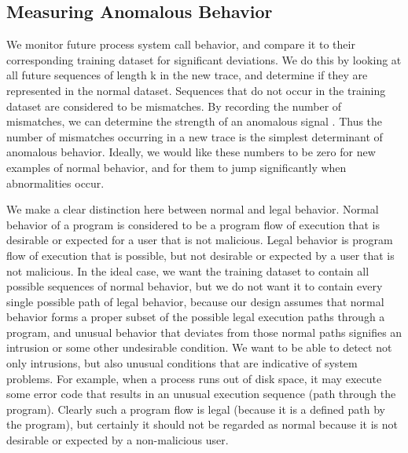 \documentclass{report}
\begin{document}
\begin{spacing}{1.5}
\section{Measuring Anomalous Behavior}


{\large
We monitor future process system call behavior, and compare it to their corresponding training dataset for significant deviations. We do this by looking at all future sequences of length k in the new trace, and determine if they are represented in the normal dataset. Sequences that do not occur in the training dataset are considered to be mismatches. By recording the number of mismatches, we can determine the strength of an anomalous signal \cite{hofmeyr1998intrusion}. Thus the number of mismatches occurring in a new trace is the simplest determinant of anomalous behavior. Ideally, we would like these numbers to be zero for new examples of normal behavior, and for them to jump significantly when abnormalities occur.
\newline
}

{\large
\noindent We make a clear distinction here between normal and legal behavior. Normal behavior of a program is considered to be a program flow of execution that is desirable or expected for a user that is not malicious. Legal behavior is program flow of execution that is possible, but not desirable or expected by a user that is not malicious. In the ideal case, we want the training dataset to contain all possible sequences of normal behavior, but we do not want it to contain every single possible path of legal behavior, because our design assumes that normal behavior forms a proper subset of the possible legal execution paths through a program, and unusual behavior that deviates from those normal paths signifies an intrusion or some other undesirable condition. We want to be able to detect not only intrusions, but also unusual conditions that are indicative of system problems. For example, when a process runs out of disk space, it may execute some error code that results in an unusual execution sequence (path through the program). Clearly such a program flow is legal (because it is a defined path by the program), but certainly it should not be regarded as normal because it is not desirable or expected by a non-malicious user.
\newline
}


\end{spacing}
\end{document}
